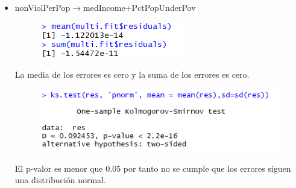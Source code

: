 \documentclass[a4paper,10pt,twocolumn]{article}
\begin{document}
\begin{itemize}
		\item {nonViolPerPop$\rightarrow$medIncome+PctPopUnderPov}
			\begin{figure}[H]
				\begin{center}
					\includegraphics[width=.92\columnwidth,right]{figures/sup5.png}
				\end{center}
			\end{figure}
			La media de los errores es cero y la suma de los errores es cero.




			\begin{figure}[H]
				\begin{center}
					\includegraphics[width=.92\columnwidth,right]{figures/sup6.png}
				\end{center}
			\end{figure}
			
			El p-valor es menor que 0.05 por tanto no se cumple que los errores siguen una distribución normal.

				



\end{itemize}
\end{document}
